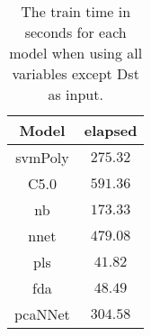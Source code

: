 \begin{table}[!ht]
	\centering
	\begin{tabular}{|c|c|}
		\hline
		Model & elapsed \\ \hline
		svmPoly & $275.32$ \\ \hline
		C5.0 & $591.36$ \\ \hline
		nb & $173.33$ \\ \hline
		nnet & $479.08$ \\ \hline
		pls & $41.82$ \\ \hline
		fda & $48.49$ \\ \hline
		pcaNNet & $304.58$ \\ \hline
	\end{tabular}
	\caption{The train time in seconds for each model when using all variables except Dst as input.}
	\label{tab:time:noDst:train}
\end{table}
